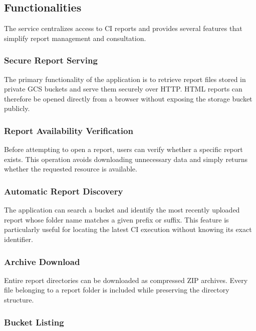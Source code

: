 \subsection{Functionalities}

The service centralizes access to CI reports and provides several features that simplify report management and consultation.

\subsubsection{Secure Report Serving}

The primary functionality of the application is to retrieve report files stored in private GCS buckets and serve them securely over HTTP. HTML reports can therefore be opened directly from a browser without exposing the storage bucket publicly.

\subsubsection{Report Availability Verification}

Before attempting to open a report, users can verify whether a specific report exists. This operation avoids downloading unnecessary data and simply returns whether the requested resource is available.

\subsubsection{Automatic Report Discovery}

The application can search a bucket and identify the most recently uploaded report whose folder name matches a given prefix or suffix. This feature is particularly useful for locating the latest CI execution without knowing its exact identifier.

\subsubsection{Archive Download}

Entire report directories can be downloaded as compressed ZIP archives. Every file belonging to a report folder is included while preserving the directory structure.

\subsubsection{Bucket Listing}

